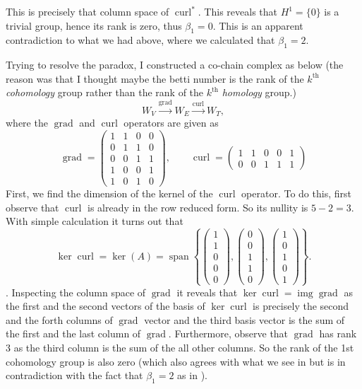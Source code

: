 \documentclass[11pt,a4paper]{article}
\newcommand{\grad}{\operatorname{grad}}
\newcommand{\curl}{\operatorname{curl}}
\newcommand{\img}{\operatorname{img}}
\begin{document}
	This is precisely that column space of $ \curl^* $. This reveals that $ H^1 = \{0\} $ is a trivial group, hence its rank is zero, thus $ \beta_1 = 0 $. This is an apparent contradiction to what we had above, where we calculated that $ \beta_1 = 2 $.
	
	Trying to resolve the paradox, I constructed a co-chain complex as below (the reason was that I thought maybe the betti number is the rank of the $ k^\text{th} $ \emph{cohomology} group rather than the rank of the $ k^\text{th} $ \emph{homology} group.)
	\[ W_V \xrightarrow{\grad} W_E \xrightarrow{\curl} W_T, \tag{2}\]
	where the $ \grad $ and $ \curl $ operators are given as
	\[ \grad = \begin{pmatrix}
		1 & 1 & 0 & 0 \\
		0 & 1 & 1 & 0 \\
		0 & 0 & 1 & 1 \\
		1 & 0 & 0 & 1 \\ 
		1 & 0 & 1 & 0
	\end{pmatrix}, \qquad
	\curl = \begin{pmatrix}
		1 & 1 & 0 & 0 & 1 \\
		0 & 0 & 1 & 1 & 1
	\end{pmatrix} \]
	First, we find the dimension of the kernel of the $ \curl $ operator. To do this, first observe that $ \curl $ is already in the row reduced form. So its nullity is $ 5 -  2 = 3 $. With simple calculation it turns out that
	\[ \ker \curl =
	\ker(A) = \operatorname{span} \left\{
	\begin{pmatrix}
		1 \\ 1 \\ 0 \\ 0 \\ 0
	\end{pmatrix},
	\begin{pmatrix}
		0 \\ 0 \\ 1 \\ 1 \\ 0
	\end{pmatrix},
	\begin{pmatrix}
		1 \\ 0 \\ 1 \\ 0 \\ 1
	\end{pmatrix}
	\right\}.
	\].
	Inspecting the column space of $ \grad $ it reveals that $ \ker \curl = \img \grad $ as the first and the second vectors of the basis of $ \ker \curl $ is precisely the second and the forth columns of $ \grad $ vector and the third basis vector is the sum of the first and the last column of $ \grad $. Furthermore, observe that $ \grad $ has rank 3 as the third column is the sum of the all other columns. So the rank of the 1st cohomology group is also zero (which also agrees with what we see in \cite{Lim2019} but is in contradiction with the fact that $ \beta_1 = 2 $ as in \cite{Gross2005}).
	
\end{document}
